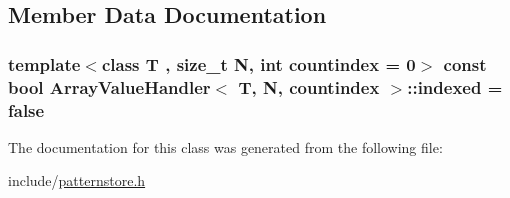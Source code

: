 \subsection{Member Data Documentation}
\hypertarget{classArrayValueHandler_a89c7c6a8820236bc45f71f446400b851}{}
\subsubsection[{indexed}]{\setlength{\rightskip}{0pt plus 5cm}template$<$class T , size\+\_\+t N, int countindex = 0$>$ const bool {\bf Array\+Value\+Handler}$<$ T, N, countindex $>$\+::indexed = false\hspace{0.3cm}{\ttfamily [static]}}\label{classArrayValueHandler_a89c7c6a8820236bc45f71f446400b851}


The documentation for this class was generated from the following file\+:\begin{DoxyCompactItemize}
\item 
include/\hyperlink{patternstore_8h}{patternstore.\+h}\end{DoxyCompactItemize}

